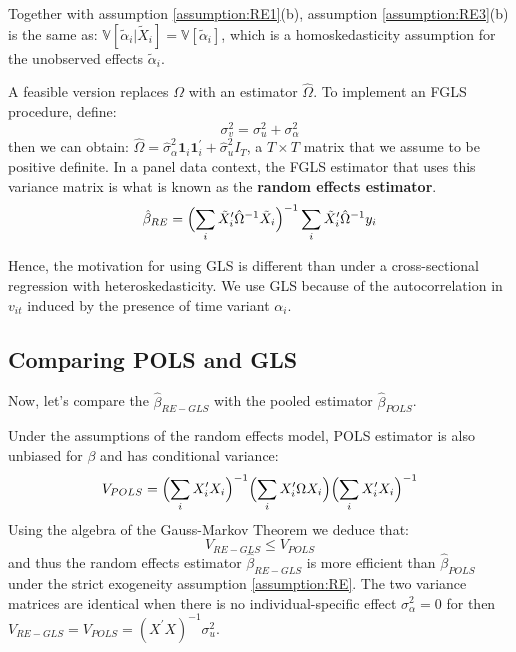 Together with assumption \ref{assumption:RE1}(b), assumption \ref{assumption:RE3}(b) is the same as: $\mathbb{V}[\tilde{\alpha}_i | \tilde{X}_i] = \mathbb{V}[\tilde{\alpha}_i]$,
which is a homoskedasticity assumption for the unobserved effects $\tilde{\alpha}_i$.

A feasible version replaces $\Omega$ with an estimator $\hat{\Omega}$. To implement an FGLS procedure, define:
\[\sigma_v^2 = \sigma_u^2 + \sigma_{\alpha}^2 \]
then we can obtain: $\hat{\Omega} = \hat{\sigma}_{\alpha}^2 \mathbf{1}_i \mathbf{1}_i^{\prime} + \hat{\sigma}_u^2 I_T$, 
a $T \times T$ matrix that we assume to be positive definite.
In a panel data context, the FGLS estimator that uses this variance matrix is what is known as the \textbf{random effects estimator}.
\[\hat{\beta}_{RE} = \Bigl( \sum_{i} \tilde{X}_i^{\prime} \hat{\Omega}^{-1} \tilde{X}_i \Bigr)^{-1} \sum_{i} \tilde{X}_i^{\prime} \hat{\Omega}^{-1} y_i \]

Hence, the motivation for using GLS is different than under a cross-sectional regression with heteroskedasticity.
We use GLS because of the autocorrelation in $v_{it}$ induced by the presence of time variant $\alpha_i$.

\subsection{Comparing POLS and GLS}

Now, let's compare the $\hat{\beta}_{RE-GLS}$ with the pooled estimator $\hat{\beta}_{POLS}$.

Under the assumptions of the random effects model, POLS estimator is also unbiased for $\beta$ and has conditional variance:
\begin{gather*}
    V_{POLS} = \Bigl(\sum_{i} X_i^{\prime} X_i \Bigr)^{-1} \Bigl( \sum_{i}  X_i^{\prime} \Omega X_i \Bigr) \Bigl( \sum_{i}  X_i^{\prime} X_i \Bigr)^{-1} 
\end{gather*}
Using the algebra of the Gauss-Markov Theorem we deduce that:
\[V_{RE-GLS} \leq V_{POLS} \]
and thus the random effects estimator $\hat{\beta}_{RE-GLS}$ is more efficient than $\hat{\beta}_{POLS} $ under the strict exogeneity assumption \ref{assumption:RE}.
The two variance matrices are identical when there is no individual-specific effect $\sigma_{\alpha}^2 = 0$ for then $V_{RE-GLS} = V_{POLS} = \left(X^{\prime} X\right)^{-1} \sigma_u^2.$

